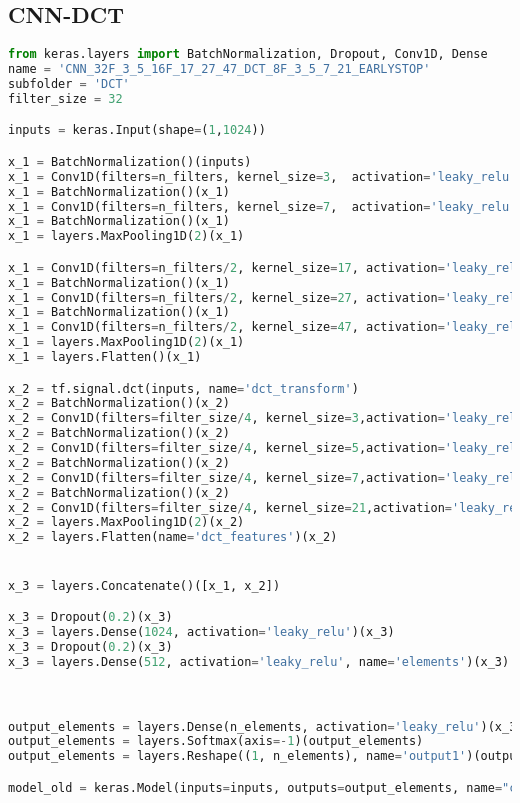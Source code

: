 \hypertarget{cnn-dct}{%
\subsection*{CNN-DCT}\label{cnn-dct}}

\begin{lstlisting}[language=Python]
from keras.layers import BatchNormalization, Dropout, Conv1D, Dense
name = 'CNN_32F_3_5_16F_17_27_47_DCT_8F_3_5_7_21_EARLYSTOP'
subfolder = 'DCT'
filter_size = 32

inputs = keras.Input(shape=(1,1024))

x_1 = BatchNormalization()(inputs)
x_1 = Conv1D(filters=n_filters, kernel_size=3,  activation='leaky_relu', data_format='channels_first')(x_1)
x_1 = BatchNormalization()(x_1)
x_1 = Conv1D(filters=n_filters, kernel_size=7,  activation='leaky_relu', data_format='channels_first')(x_1)
x_1 = BatchNormalization()(x_1)
x_1 = layers.MaxPooling1D(2)(x_1)

x_1 = Conv1D(filters=n_filters/2, kernel_size=17, activation='leaky_relu', data_format='channels_first')(x_1)
x_1 = BatchNormalization()(x_1)
x_1 = Conv1D(filters=n_filters/2, kernel_size=27, activation='leaky_relu', data_format='channels_first')(x_1)
x_1 = BatchNormalization()(x_1)
x_1 = Conv1D(filters=n_filters/2, kernel_size=47, activation='leaky_relu', data_format='channels_first')(x_1)
x_1 = layers.MaxPooling1D(2)(x_1)
x_1 = layers.Flatten()(x_1)

x_2 = tf.signal.dct(inputs, name='dct_transform')
x_2 = BatchNormalization()(x_2)
x_2 = Conv1D(filters=filter_size/4, kernel_size=3,activation='leaky_relu', data_format='channels_first')(x_2)
x_2 = BatchNormalization()(x_2)
x_2 = Conv1D(filters=filter_size/4, kernel_size=5,activation='leaky_relu', data_format='channels_first')(x_2)
x_2 = BatchNormalization()(x_2)
x_2 = Conv1D(filters=filter_size/4, kernel_size=7,activation='leaky_relu', data_format='channels_first')(x_2)
x_2 = BatchNormalization()(x_2)
x_2 = Conv1D(filters=filter_size/4, kernel_size=21,activation='leaky_relu',data_format='channels_first')(x_2)
x_2 = layers.MaxPooling1D(2)(x_2)
x_2 = layers.Flatten(name='dct_features')(x_2)


x_3 = layers.Concatenate()([x_1, x_2])

x_3 = Dropout(0.2)(x_3)
x_3 = layers.Dense(1024, activation='leaky_relu')(x_3)
x_3 = Dropout(0.2)(x_3)
x_3 = layers.Dense(512, activation='leaky_relu', name='elements')(x_3)



output_elements = layers.Dense(n_elements, activation='leaky_relu')(x_3)
output_elements = layers.Softmax(axis=-1)(output_elements)
output_elements = layers.Reshape((1, n_elements), name='output1')(output_elements)

model_old = keras.Model(inputs=inputs, outputs=output_elements, name="cnn_dct")
\end{lstlisting}

